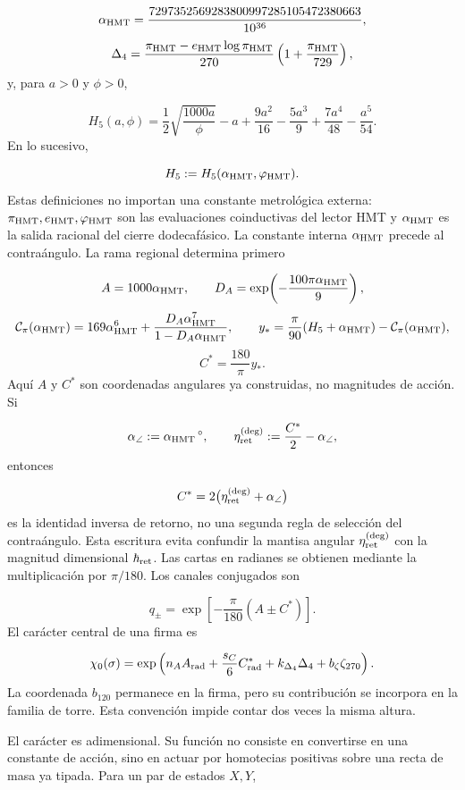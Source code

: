\[
\alpha_{\rm HMT}
=\frac{7297352569283800997285105472380663}{10^{36}},
\]
\[
\Delta_4
=\frac{\pi_{\rm HMT}-e_{\rm HMT}\log\pi_{\rm HMT}}{270}
\left(1+\frac{\pi_{\rm HMT}}{729}\right),
\]
y, para \(a>0\) y \(\phi>0\),

\[
H_5(a,\phi)
=\frac12\sqrt{\frac{1000a}{\phi}}-a
+\frac{9a^2}{16}-\frac{5a^3}{9}
+\frac{7a^4}{48}-\frac{a^5}{54}.
\]
En lo sucesivo,

\[
H_5:=H_5(\alpha_{\rm HMT},\varphi_{\rm HMT}).
\]
Estas definiciones no importan una constante metrológica externa: \(\pi_{\rm HMT},e_{\rm HMT},\varphi_{\rm HMT}\) son las evaluaciones coinductivas del lector HMT y \(\alpha_{\rm HMT}\) es la salida racional del cierre dodecafásico. La constante interna \(\alpha_{\rm HMT}\) precede al contraángulo. La rama regional determina primero

\[
A=1000\alpha_{\rm HMT},
\qquad
D_A=\exp\!\left(-\frac{100\pi\alpha_{\rm HMT}}9\right),
\]
\[
\mathcal C_\pi(\alpha_{\rm HMT})
=169\alpha_{\rm HMT}^{6}
+\frac{D_A\alpha_{\rm HMT}^{7}}
       {1-D_A\alpha_{\rm HMT}},
\qquad
y_*=\frac{\pi}{90}(H_5+\alpha_{\rm HMT})
-\mathcal C_\pi(\alpha_{\rm HMT}),
\]
\[
C^*=\frac{180}{\pi}y_*.
\]
Aquí \(A\) y \(C^*\) son coordenadas angulares ya construidas, no magnitudes de acción. Si

\[
\alpha_\angle:=\alpha_{\rm HMT}\,{}^\circ,
\qquad
\eta_{\rm ret}^{(\deg)}:=\frac{C^*}{2}-\alpha_\angle,
\]
entonces

\[
C^*=2\bigl(\eta_{\rm ret}^{(\deg)}+\alpha_\angle\bigr)
\]
es la identidad inversa de retorno, no una segunda regla de selección del contraángulo. Esta escritura evita confundir la mantisa angular \(\eta_{\rm ret}^{(\deg)}\) con la magnitud dimensional \(\hbar_{\rm ret}\). Las cartas en radianes se obtienen mediante la multiplicación por \(\pi/180\). Los canales conjugados son

\[
q_\pm=\exp\left[-\frac\pi{180}(A\pm C^*)\right].
\]
El carácter central de una firma es

\[
\chi_0(\sigma)=
\exp\left(
n_AA_{\rm rad}
+\frac{s_C}{6}C^*_{\rm rad}
+k_{\Delta_4}\Delta_4
+b_\zeta\zeta_{270}
\right).
\]
La coordenada \(b_{120}\) permanece en la firma, pero su contribución se incorpora en la familia de torre. Esta convención impide contar dos veces la misma altura.

El carácter es adimensional. Su función no consiste en convertirse en una constante de acción, sino en actuar por homotecias positivas sobre una recta de masa ya tipada. Para un par de estados \(X,Y\),

